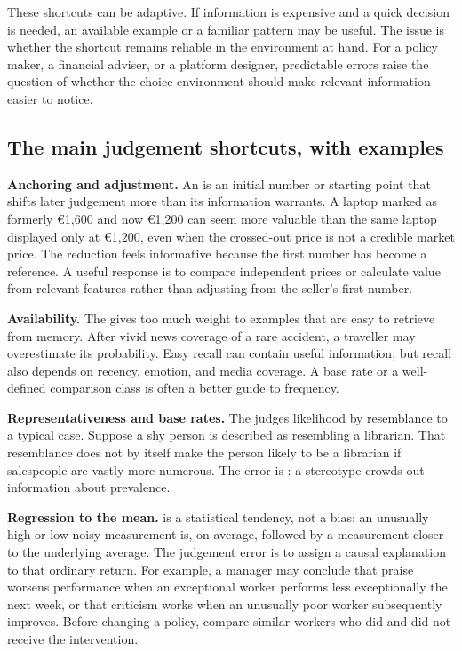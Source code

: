 These shortcuts can be adaptive. If information is expensive and a quick
decision is needed, an available example or a familiar pattern may be useful.
The issue is whether the shortcut remains reliable in the environment at hand.
For a policy maker, a financial adviser, or a platform designer, predictable
errors raise the question of whether the choice environment should make
relevant information easier to notice.

\subsection{The main judgement shortcuts, with examples}

\textbf{Anchoring and adjustment.} An  is an initial number
or starting point that shifts later judgement more than its information
warrants. A laptop marked as formerly \euro1,600 and now \euro1,200 can seem
more valuable than the same laptop displayed only at \euro1,200, even when the
crossed-out price is not a credible market price. The reduction feels
informative because the first number has become a reference. A useful response
is to compare independent prices or calculate value from relevant features
rather than adjusting from the seller's first number.

\textbf{Availability.} The  gives too much
weight to examples that are easy to retrieve from memory. After vivid news
coverage of a rare accident, a traveller may overestimate its probability.
Easy recall can contain useful information, but recall also depends on
recency, emotion, and media coverage. A base rate or a well-defined comparison
class is often a better guide to frequency.

\textbf{Representativeness and base rates.} The
 judges likelihood by resemblance to a
typical case. Suppose a shy person is described as resembling a librarian.
That resemblance does not by itself make the person likely to be a librarian
if salespeople are vastly more numerous. The error is : a stereotype crowds out information about prevalence.

\textbf{Regression to the mean.}  is a
statistical tendency, not a bias: an unusually high or low noisy measurement
is, on average, followed by a measurement closer to the underlying average.
The judgement error is to assign a causal explanation to that ordinary return.
For example, a manager may conclude that praise worsens performance when an
exceptional worker performs less exceptionally the next week, or that criticism
works when an unusually poor worker subsequently improves. Before changing a
policy, compare similar workers who did and did not receive the intervention.

